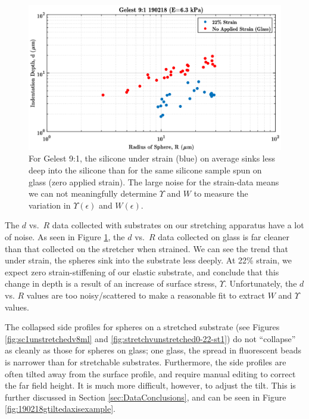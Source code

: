 \begin{figure}[h!]
	\centering
	\includegraphics[width=\linewidth]{Chapters/Figures/g190218_glass_vs_22percent_dvsR.pdf}
	\caption[Glass vs. Stretched d vs. R]{For Gelest 9:1, the silicone under strain (blue) on average sinks less deep into the silicone than for the same silicone sample spun on glass (zero applied strain). The large noise for the strain-data means we can not meaningfully determine $ \Upsilon $ and $ W $ to measure the variation in $ \Upsilon(\epsilon)$ and $W(\epsilon)$.}
	\label{fig:glassvsstretched190218}
\end{figure}

The $ d $ vs.~$R $ data collected with substrates on our stretching apparatus have a lot of noise. As seen in Figure \ref{fig:glassvsstretched190218}, the $ d $ vs.~$ R $ data collected on glass is far cleaner than that collected on the stretcher when strained. We can see the trend that under strain, the spheres sink into the substrate less deeply. At 22\% strain, we expect zero strain-stiffening of our elastic substrate, and conclude that this change in depth is a result of an increase of surface stress, $ \Upsilon $. Unfortunately, the $ d $ vs. $ R $ values are too noisy/scattered to make a reasonable fit to extract $ W $ and $ \Upsilon $ values.

The collapsed side profiles for spheres on a stretched substrate (see Figures \ref{fig:sc1unstretchedv8ml} and \ref{fig:stretchvunstretched0-22-st1}) do not ``collapse'' as cleanly as those for spheres on glass; one glass, the spread in fluorescent beads is narrower than for stretchable substrates. Furthermore, the side profiles are often tilted away from the surface profile, and require manual editing to correct the far field height. It is much more difficult, however, to adjust the tilt. This is further discussed in Section \ref{sec:DataConclusions}, and can be seen in Figure \ref{fig:190218gtiltedaxisexample}.   

